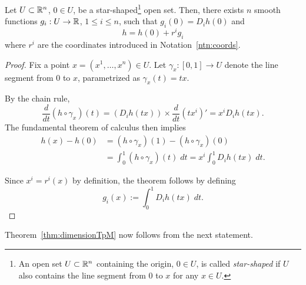 \begin{lem}\label{lem:Taylor}
    Let $U\subset\mathbb{R}^n$, $0\in U$, be a star-shaped\footnote{An open set $U\subset\mathbb{R}^n$ containing the origin, $0\in U$, is called \emph{star-shaped} if $U$ also contains the line segment from $0$ to $x$ for any $x\in U$.} open set.
    Then, there exists $n$ smooth functions $g_i: U \to \mathbb{R}$, $1\leq i \leq n$, such that $g_i(0) = D_i h(0)$ and
    \begin{equation}
        h = h(0) + r^i g_i
    \end{equation}
    where $r^i$ are the coordinates introduced in Notation~\ref{ntn:coords}.
\end{lem}
\begin{proof}
    Fix a point $x = (x^1, \ldots, x^n) \in U$.
    Let $\gamma_x:[0,1]\to U$ denote the line segment from $0$ to $x$, parametrized as $\gamma_x(t) = tx$.

    By the chain rule,
    \begin{equation}
        \frac{d}{dt}(h \circ \gamma_x) (t) = \left(D_i h(t x)\right) \times \frac{d}{dt} (t x^i)' = x^i D_i h(t x).
    \end{equation}
    The fundamental theorem of calculus then implies
    \begin{align}
        h(x) - h(0) &= (h \circ \gamma_x)(1) - (h \circ \gamma_x)(0) \\
        &= \int_0^1 (h \circ \gamma_x)(t)\;dt = x^i \int_0^1 D_i h(tx)\; dt.
    \end{align}

    Since $x^i = r^i(x)$ by definition, the theorem follows by defining
    \begin{equation}
        g_i(x) := \int_0^1 D_i h(tx)\; dt.
    \end{equation}
\end{proof}

Theorem~\ref{thm:dimensionTpM} now follows from the next statement.

